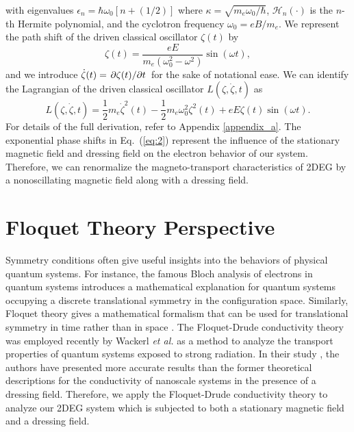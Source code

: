 \documentclass[
 reprint,
 amsmath,amssymb,
 aps,
 prb,
]{revtex4-2}
\begin{document}
with eigenvalues $\epsilon_n = \hbar \omega_0 [n + (1/2)]$ where $\kappa = \sqrt{{m_e \omega_0}/{\hbar}}$, $\mathcal{H}_n(\cdot)$ is the $n$-th Hermite polynomial, and the cyclotron frequency $\omega_0 = eB/m_e$.
We represent the path shift of the driven classical oscillator $\zeta(t)$ by
\begin{equation} \label{eq:4}
  \zeta(t) = \frac{eE}{m_e(\omega_0^2 - \omega^2)}\sin(\omega t),
\end{equation}
and we introduce $\dot{\zeta}(t) = \pdv*{\zeta(t)}{t}$ for the sake of notational ease. We can identify the Lagrangian of the driven classical oscillator $L(\zeta,\dot{\zeta},t)$ as
\begin{equation} \label{eq:5}
  L(\zeta,\dot{\zeta},t) = \frac{1}{2} m_e\dot{\zeta}^2(t) - \frac{1}{2}m_e\omega_0^2 \zeta^2(t) + eE\zeta(t) \sin(\omega t).
\end{equation}
For details of the full derivation, refer to Appendix \ref{appendix_a}.
The exponential phase shifts in Eq.~(\ref{eq:2}) represent the influence of the stationary magnetic field and dressing field on the electron behavior of our system. Therefore, we can renormalize the magneto-transport characteristics of 2DEG by a nonoscillating magnetic field along with a dressing field.

\section{\label{sec:floquet_theory} Floquet Theory Perspective}

Symmetry conditions often give useful insights into the behaviors of physical quantum systems.
For instance, the famous Bloch analysis of electrons in quantum systems introduces a mathematical explanation for quantum systems occupying a discrete translational symmetry in the configuration space. Similarly, Floquet theory gives a mathematical formalism that can be used for translational symmetry in time rather than in space \cite{floquet83,grifoni98,holthaus15}.
The Floquet-Drude conductivity theory was employed recently by Wackerl \textit{et al.} \cite{wackerl20} as a method to analyze the transport properties of quantum systems exposed to strong radiation.
{\color{Red}
In their study \cite{wackerl20}, the authors have presented more accurate results than the former theoretical descriptions \cite{morina15,pervishko15} for the conductivity of nanoscale systems in the  presence of a dressing field.} Therefore, we apply the Floquet-Drude conductivity theory to analyze our 2DEG system which is subjected to both a stationary magnetic field and a dressing field.
\end{document}
